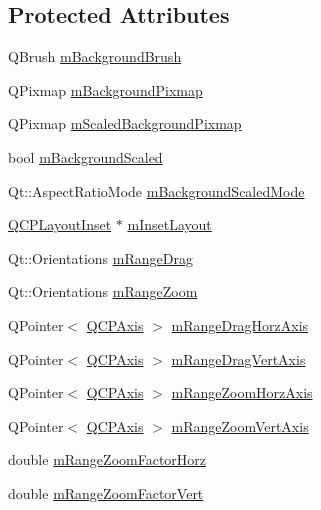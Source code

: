 \subsection*{Protected Attributes}
\begin{DoxyCompactItemize}
\item 
Q\+Brush \hyperlink{class_q_c_p_axis_rect_a5748e1a37f63c428e38b0a7724b46259}{m\+Background\+Brush}
\item 
Q\+Pixmap \hyperlink{class_q_c_p_axis_rect_a38fb1a15f43228a0c124553649303722}{m\+Background\+Pixmap}
\item 
Q\+Pixmap \hyperlink{class_q_c_p_axis_rect_aa74b9415598d59b49290e41e42d7ee27}{m\+Scaled\+Background\+Pixmap}
\item 
bool \hyperlink{class_q_c_p_axis_rect_a5ad835f0fae5d7cc5ada9e063641dbf1}{m\+Background\+Scaled}
\item 
Qt\+::\+Aspect\+Ratio\+Mode \hyperlink{class_q_c_p_axis_rect_a859fd368e794663e346b4f53f35078e9}{m\+Background\+Scaled\+Mode}
\item 
\hyperlink{class_q_c_p_layout_inset}{Q\+C\+P\+Layout\+Inset} $\ast$ \hyperlink{class_q_c_p_axis_rect_a255240399e0fd24baad80cbbe46f698a}{m\+Inset\+Layout}
\item 
Qt\+::\+Orientations \hyperlink{class_q_c_p_axis_rect_aa9f107f66ca3469ad50ee6cea7c9e237}{m\+Range\+Drag}
\item 
Qt\+::\+Orientations \hyperlink{class_q_c_p_axis_rect_a215eff671d48df2edccc36e7f976f28c}{m\+Range\+Zoom}
\item 
Q\+Pointer$<$ \hyperlink{class_q_c_p_axis}{Q\+C\+P\+Axis} $>$ \hyperlink{class_q_c_p_axis_rect_aeaaa38c6d2030dd5f84461e2596e41e3}{m\+Range\+Drag\+Horz\+Axis}
\item 
Q\+Pointer$<$ \hyperlink{class_q_c_p_axis}{Q\+C\+P\+Axis} $>$ \hyperlink{class_q_c_p_axis_rect_a3e41dffec18987366f2a8ffd80689c12}{m\+Range\+Drag\+Vert\+Axis}
\item 
Q\+Pointer$<$ \hyperlink{class_q_c_p_axis}{Q\+C\+P\+Axis} $>$ \hyperlink{class_q_c_p_axis_rect_ae22f882bab20518559f3fbb84243d0ab}{m\+Range\+Zoom\+Horz\+Axis}
\item 
Q\+Pointer$<$ \hyperlink{class_q_c_p_axis}{Q\+C\+P\+Axis} $>$ \hyperlink{class_q_c_p_axis_rect_a8b9acd16a203a9692bd35a9465f54bc1}{m\+Range\+Zoom\+Vert\+Axis}
\item 
double \hyperlink{class_q_c_p_axis_rect_ad08d0250ed7b99de387d0ea6c7fd4dc1}{m\+Range\+Zoom\+Factor\+Horz}
\item 
double \hyperlink{class_q_c_p_axis_rect_a32f063629581d5bf82b12769940b34ad}{m\+Range\+Zoom\+Factor\+Vert}

\end{DoxyCompactItemize}
